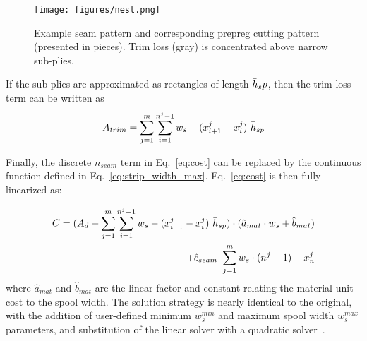 \begin{figure}
    \centering
    \texttt{[image: figures/nest.png]}
    \caption{Example seam pattern and corresponding prepreg cutting pattern (presented in pieces). Trim loss (gray) is concentrated above narrow sub-plies.}
    \label{fig:nest}
\end{figure}

If the sub-plies are approximated as rectangles of length $\Bar{h}_sp$, then the trim loss term can be written as 
\begin{equation}
     A_{trim} = \sum_{j=1}^m \sum_{i=1}^{n^j-1} w_s - (x_{i+1}^j - x_i^j) \ \Bar{h}_{sp}
\end{equation}

Finally, the discrete $n_{seam}$ term in Eq.~\eqref{eq:cost} can be replaced by the continuous function defined in Eq.~\eqref{eq:strip_width_max}.
Eq.~\eqref{eq:cost} is then fully linearized as: 

\begin{equation}
    \label{eq:reduced_cost}
    \begin{split}
         C = (A_d + \sum_{j=1}^m \sum_{i=1}^{n^j-1} w_s - (x_{i+1}^j - x_i^j) \ \Bar{h}_{sp}) \cdot (\hat{a}_{mat} \cdot w_s + \hat{b}_{mat}) \\
         + \hat{c}_{seam} \ \sum_{j=1}^m w_s \cdot (n^j-1) - x_{n}^j
    \end{split}
\end{equation}
where $\hat{a}_{mat}$ and $\hat{b}_{mat}$ are the linear factor and constant relating the material unit cost to the spool width. The solution strategy is nearly identical to the original, with the addition of user-defined minimum $w_s^{min}$ and maximum spool width $w_s^{max}$ parameters, and substitution of the linear solver with a quadratic solver~\cite{nocedal2006quadratic}.
